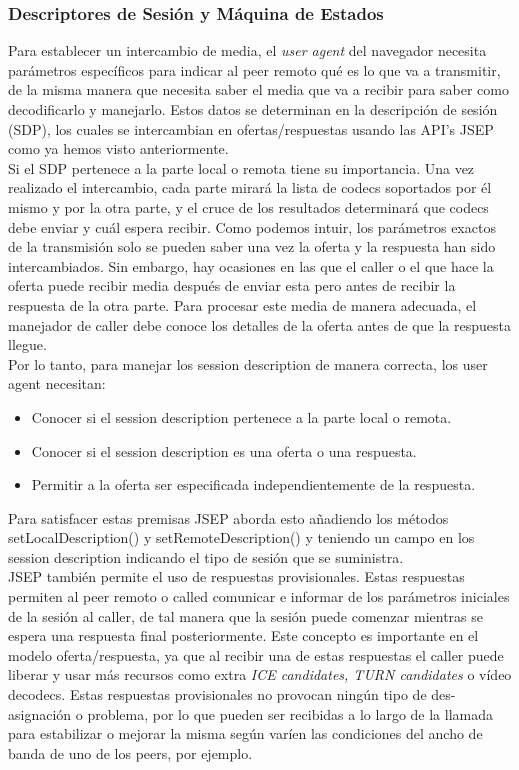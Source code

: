 \subsubsection{Descriptores de Sesión y Máquina de Estados}

Para establecer un intercambio de media, el \textit{user agent} del navegador necesita parámetros específicos para indicar al peer remoto qué es lo que va a transmitir, de la misma manera que necesita saber el media que va a recibir para saber como decodificarlo y manejarlo. Estos datos se determinan en la descripción de sesión (SDP), los cuales se intercambian en ofertas/respuestas usando las API's JSEP como ya hemos visto anteriormente.\\

Si el SDP pertenece a la parte local o remota tiene su importancia. Una vez realizado el intercambio, cada parte mirará la lista de codecs soportados por él mismo y por la otra parte, y el cruce de los resultados determinará que codecs debe enviar y cuál espera recibir. Como podemos intuir, los parámetros exactos de la transmisión solo se pueden saber una vez la oferta y la respuesta han sido intercambiados. Sin embargo, hay ocasiones en las que el caller o el que hace la oferta puede recibir media después de enviar esta pero antes de recibir la respuesta de la otra parte. Para procesar este media de manera adecuada, el manejador de caller debe conoce los detalles de la oferta antes de que la respuesta llegue.\\

Por lo tanto, para manejar los session description de manera correcta, los user agent necesitan:

\begin{itemize}
\item Conocer si el session description pertenece a la parte local o remota.
\item Conocer si el session description es una oferta o una respuesta.
\item Permitir a la oferta ser especificada independientemente de la respuesta.
\end{itemize}

Para satisfacer estas premisas JSEP aborda esto añadiendo los métodos setLocalDescription() y setRemoteDescription() y teniendo un campo en los session description indicando el tipo de sesión que se suministra.\\

JSEP también permite el uso de respuestas provisionales. Estas respuestas permiten al peer remoto o called comunicar e informar de los parámetros iniciales de la sesión al caller, de tal manera que la sesión puede comenzar mientras se espera una respuesta final posteriormente. Este concepto es importante en el modelo oferta/respuesta, ya que al recibir una de estas respuestas el caller puede liberar y usar más recursos como extra \textit{ICE candidates, TURN candidates} o vídeo decodecs. Estas respuestas provisionales no provocan ningún tipo de des-asignación o problema, por lo que pueden ser recibidas a lo largo de la llamada para estabilizar o mejorar la misma según varíen las condiciones del ancho de banda de uno de los peers, por ejemplo.\\


